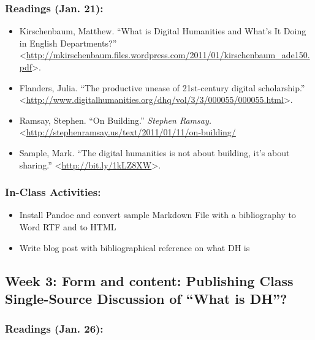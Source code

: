 \documentclass[]{article}
\begin{document}
\subsubsection{Readings (Jan. 21):}\label{readings-jan.-21}

\begin{itemize}
\itemsep1pt\parskip0pt
\item
  Kirschenbaum, Matthew. ``What is Digital Humanities and What's It
  Doing in English Departments?''
  \textless{}\url{http://mkirschenbaum.files.wordpress.com/2011/01/kirschenbaum_ade150.pdf}\textgreater{}.
\item
  Flanders, Julia. ``The productive unease of 21st-century digital
  scholarship.''
  \textless{}\url{http://www.digitalhumanities.org/dhq/vol/3/3/000055/000055.html}\textgreater{}.
\item
  Ramsay, Stephen. ``On Building.'' \emph{Stephen Ramsay.}
  \textless{}\url{http://stephenramsay.us/text/2011/01/11/on-building/}
\item
  Sample, Mark. ``The digital humanities is not about building, it's
  about sharing.'' \textless{}\url{http://bit.ly/1kLZ8XW}\textgreater{}.
\end{itemize}

\subsubsection{In-Class Activities:}\label{in-class-activities}

\begin{itemize}
\itemsep1pt\parskip0pt
\item
  Install Pandoc and convert sample Markdown File with a bibliography to
  Word RTF and to HTML
\item
  Write blog post with bibliographical reference on what DH is
\end{itemize}

\subsection{Week 3: Form and content: Publishing Class Single-Source
Discussion of ``What is
DH''?}\label{week-3-form-and-content-publishing-class-single-source-discussion-of-what-is-dh}

\subsubsection{Readings (Jan. 26):}\label{readings-jan.-26}
\end{document}
